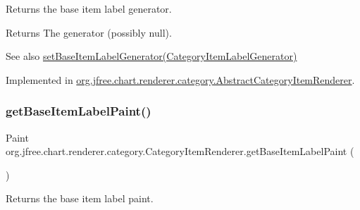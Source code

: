 Returns the base item label generator.

\begin{DoxyReturn}{Returns}
The generator (possibly {\ttfamily null}).
\end{DoxyReturn}
\begin{DoxySeeAlso}{See also}
\mbox{\hyperlink{interfaceorg_1_1jfree_1_1chart_1_1renderer_1_1category_1_1_category_item_renderer_aa4ca7bd2b2d702c879718fece021d3a4}{set\+Base\+Item\+Label\+Generator(\+Category\+Item\+Label\+Generator)}} 
\end{DoxySeeAlso}


Implemented in \mbox{\hyperlink{classorg_1_1jfree_1_1chart_1_1renderer_1_1category_1_1_abstract_category_item_renderer_a8cb1f3366a62871739928e4b5c75ade5}{org.\+jfree.\+chart.\+renderer.\+category.\+Abstract\+Category\+Item\+Renderer}}.

\mbox{\label{interfaceorg_1_1jfree_1_1chart_1_1renderer_1_1category_1_1_category_item_renderer_a7235637c78c4be2e7cf0a2d46e03a034}} 
\subsubsection{\texorpdfstring{get\+Base\+Item\+Label\+Paint()}{getBaseItemLabelPaint()}}
{\footnotesize\ttfamily Paint org.\+jfree.\+chart.\+renderer.\+category.\+Category\+Item\+Renderer.\+get\+Base\+Item\+Label\+Paint (\begin{DoxyParamCaption}{ }\end{DoxyParamCaption})}

Returns the base item label paint.

